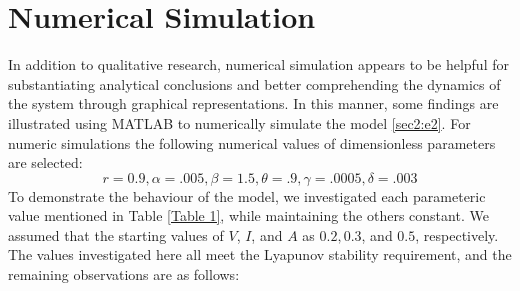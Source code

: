 \documentclass[12pt]{article}
\numberwithin{equation}{section}
\begin{document}
\section{Numerical Simulation}
In addition to qualitative research, numerical simulation appears to be helpful for substantiating analytical conclusions and better comprehending the dynamics of the system through graphical representations. In this manner, some findings are illustrated using MATLAB to numerically simulate the model \eqref{sec2:e2}. For numeric simulations the following numerical values of dimensionless parameters are selected:
\begin{equation}
r=0.9, \alpha=.005, \beta=1.5, \theta=.9, \gamma=.0005, \delta=.003
\end{equation}
To demonstrate the behaviour of the model, we investigated each parameteric value mentioned in Table \ref{Table 1}, while maintaining the others constant. We assumed that the starting values of $V$, $I$, and $A$ as $0.2, 0.3$, and $0.5$, respectively. The values investigated here all meet the Lyapunov stability requirement, and the remaining observations are as follows:
\end{document}

